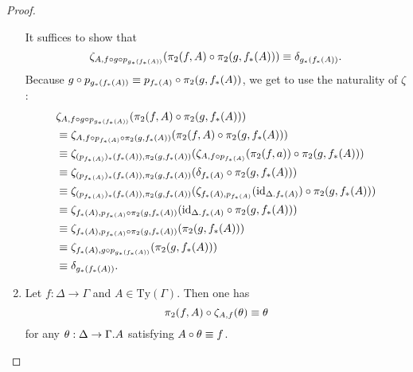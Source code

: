 \begin{proof}
\begin{enumerate}
\medskip
It suffices to show that
\begin{equation*}
\zeta_{A,f\circ g\circ p_{g_\ast(f_\ast(A))}}(\pi_2(f,A)\circ\pi_2(g,f_\ast(A)))\equiv\delta_{g_\ast(f_\ast(A))}.
\end{equation*}
Because $g\circ p_{g_\ast(f_\ast(A))}\equiv p_{f_\ast(A)}\circ\pi_2(g,f_\ast(A))$, we get
to use the naturality of $\zeta$:
\begin{align*}
& \zeta_{A,f\circ g\circ p_{g_\ast(f_\ast(A))}}(\pi_2(f,A)\circ\pi_2(g,f_\ast(A))) \\
& \jdeq
\zeta_{A,f\circ p_{f_\ast(A)}\circ\pi_2(g,f_\ast(A))}(\pi_2(f,A)\circ\pi_2(g,f_\ast(A))) \\
& \jdeq
\zeta_{(p_{f_\ast(A)})_\ast(f_\ast(A)),\pi_2(g,f_\ast(A))}(\zeta_{A,f\circ p_{f_\ast(A)}}(\pi_2(f,a))\circ\pi_2(g,f_\ast(A))) \\
& \jdeq
\zeta_{(p_{f_\ast(A)})_\ast(f_\ast(A)),\pi_2(g,f_\ast(A))}(\delta_{f_\ast(A)}\circ\pi_2(g,f_\ast(A))) \\
& \jdeq
\zeta_{(p_{f_\ast(A)})_\ast(f_\ast(A)),\pi_2(g,f_\ast(A))}(\zeta_{f_\ast(A),p_{f_\ast(A)}}(\catid{\ctxext{\Delta}{f_\ast(A)}})\circ\pi_2(g,f_\ast(A))) \\
& \jdeq
\zeta_{f_\ast(A),p_{f_\ast(A)}\circ\pi_2(g,f_\ast(A))}(\catid{\ctxext{\Delta}{f_\ast(A)}}\circ\pi_2(g,f_\ast(A))) \\
& \jdeq
\zeta_{f_\ast(A),p_{f_\ast(A)}\circ\pi_2(g,f_\ast(A))}(\pi_2(g,f_\ast(A))) \\
& \jdeq
\zeta_{f_\ast(A),g\circ p_{g_\ast(f_\ast(A))}}(\pi_2(g,f_\ast(A)))\\
& \jdeq
\delta_{g_\ast(f_\ast(A))}.
\end{align*}
\item
Let $f:\Delta\to\Gamma$ and $A\in\mathrm{Ty}(\Gamma)$. Then one has 
\begin{equation*}
\pi_2(f,A)\circ\zeta_{A,f}(\theta)\equiv\theta
\end{equation*}
for any $\theta:\Delta\to\ctxext{\Gamma}{A}$ satisfying $A\circ\theta\equiv f$.


\end{enumerate}
\end{proof}
